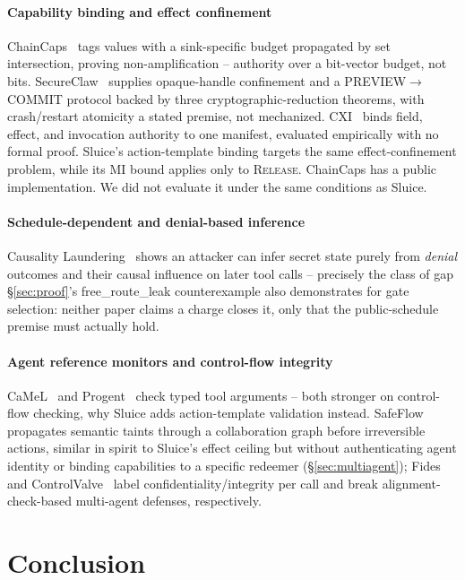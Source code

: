 \documentclass[conference,compsoc]{IEEEtran}
\newcommand{\sys}{Sluice}
\begin{document}
\paragraph{Capability binding and effect confinement} 
ChainCaps~\cite{chaincaps2026} tags values with a sink-specific budget propagated by set intersection, proving non-amplification -- authority over a bit-vector budget, not bits. SecureClaw~\cite{secureclaw2026} supplies opaque-handle confinement and a PREVIEW$\to$COMMIT protocol backed by three cryptographic-reduction theorems, with crash/restart atomicity a stated premise, not mechanized. CXI~\cite{cxi2026} binds field, effect, and invocation authority to one manifest, evaluated empirically with no formal proof. \sys{}'s action-template binding targets the same effect-confinement problem, while its MI bound applies only to \textsc{Release}. ChainCaps has a public implementation. We did not evaluate it under the same conditions as Sluice.

\paragraph{Schedule-dependent and denial-based inference} Causality
Laundering~\cite{causalitylaundering2026} shows an attacker can infer
secret state purely from \emph{denial} outcomes and their causal
influence on later tool calls -- precisely the class of gap
\S\ref{sec:proof}'s free\_route\_leak counterexample also demonstrates
for gate selection: neither paper claims a charge closes it, only that
the public-schedule premise must actually hold.

\paragraph{Agent reference monitors and control-flow integrity}
CaMeL~\cite{camel2025} and Progent~\cite{progent2025} check typed tool
arguments -- both stronger on control-flow checking, why \sys{} adds
action-template validation instead. SafeFlow~\cite{safeflow2026}
propagates semantic taints through a collaboration graph before
irreversible actions, similar in spirit to \sys{}'s effect ceiling but
without authenticating agent identity or binding capabilities to a
specific redeemer (\S\ref{sec:multiagent}); Fides~\cite{fides2025} and
ControlValve~\cite{controlvalve2026} label confidentiality/integrity per
call and break alignment-check-based multi-agent defenses, respectively.

\section{Conclusion}
\end{document}
